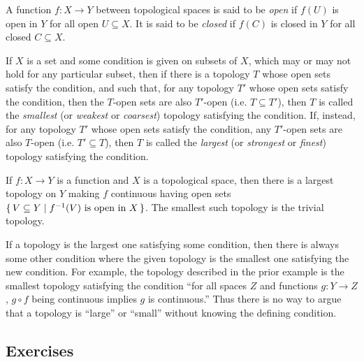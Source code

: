 \documentclass[letterpaper, 11pt, oneside]{book}
\begin{document}
\begin{defn}
  A function $f\colon X \to Y$ between topological spaces is said to be \emph{open} if $f(U)$ is open in $Y$ for all open $U \subseteq X$.
  It is said to be \emph{closed} if $f(C)$ is closed in $Y$ for all closed $C \subseteq X$.
\end{defn}

\clearpage

\begin{defn}
  If $X$ is a set and some condition is given on subsets of $X$, which may or may not hold for any particular subset, then if there is a topology $T$ whose open sets satisfy the condition, and such that, for any topology $T'$ whose open sets satisfy the condition, then the $T$-open sets are also $T'$-open (i.e. $T \subseteq T'$), then $T$ is called the \emph{smallest} (or \emph{weakest} or \emph{coarsest}) topology satisfying the condition.
  If, instead, for any topology $T'$ whose open sets satisfy the condition, any $T'$-open sets are also $T$-open (i.e. $T' \subseteq T$), then $T$ is called the \emph{largest} (or \emph{strongest} or \emph{finest}) topology satisfying the condition.
\end{defn}

\begin{ex}
  If $f\colon X \to Y$ is a function and $X$ is a topological space, then there is a largest topology on $Y$ making $f$ continuous having open sets $\set{V \subseteq Y | f^{-1}(V) \text{ is open in } X}$.
  The smallest such topology is the trivial topology.
\end{ex}

If a topology is the largest one satisfying some condition, then there is always some other condition where the given topology is the smallest one satisfying the new condition.
For example, the topology described in the prior example is the smallest topology satisfying the condition ``for all spaces $Z$ and functions $g\colon Y \to Z$, $g \circ f$ being continuous implies $g$ is continuous.''
Thus there is no way to argue that a topology is ``large'' or ``small'' without knowing the defining condition.

\clearpage

\subsection*{Exercises}
\end{document}
